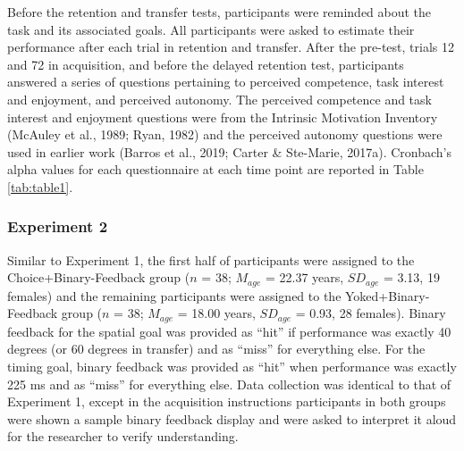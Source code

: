 \documentclass[
  man, donotrepeattitle,floatsintext]{apa7}
\begin{document}
Before the retention and transfer tests, participants were reminded about the task and its associated goals. All participants were asked to estimate their performance after each trial in retention and transfer. After the pre-test, trials 12 and 72 in acquisition, and before the delayed retention test, participants answered a series of questions pertaining to perceived competence, task interest and enjoyment, and perceived autonomy. The perceived competence and task interest and enjoyment questions were from the Intrinsic Motivation Inventory (McAuley et al., 1989; Ryan, 1982) and the perceived autonomy questions were used in earlier work (Barros et al., 2019; Carter \& Ste-Marie, 2017a). Cronbach's alpha values for each questionnaire at each time point are reported in Table \ref{tab:table1}.

\hypertarget{experiment-2-1}{%
\subsubsection{Experiment 2}\label{experiment-2-1}}

Similar to Experiment 1, the first half of participants were assigned to the Choice+Binary-Feedback group (\(n\) = 38; \(M_{age}\) = 22.37 years, \(SD_{age}\) = 3.13, 19 females) and the remaining participants were assigned to the Yoked+Binary-Feedback group (\(n\) = 38; \(M_{age}\) = 18.00 years, \(SD_{age}\) = 0.93, 28 females). Binary feedback for the spatial goal was provided as ``hit'' if performance was exactly 40 degrees (or 60 degrees in transfer) and as ``miss'' for everything else. For the timing goal, binary feedback was provided as ``hit'' when performance was exactly 225 ms and as ``miss'' for everything else. Data collection was identical to that of Experiment 1, except in the acquisition instructions participants in both groups were shown a sample binary feedback display and were asked to interpret it aloud for the researcher to verify understanding.
\end{document}
